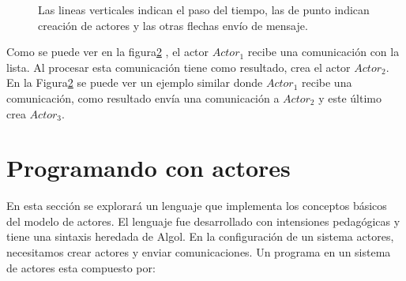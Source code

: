 \begin{figure}[H]
\begin{subfigure}{.5\textwidth}

\label{fig:actores:crecion:b}
\caption{}
\end{subfigure}

\label{fig:actores:crecion}
\caption{Las lineas verticales indican el paso del tiempo, las de punto indican creación de actores y las otras flechas envío de mensaje.}
\end{figure}

Como se puede ver en la figura\ref{fig:actores:crecion} , el actor $Actor_1$ recibe una comunicación con la lista. Al procesar esta comunicación tiene como resultado, crea el actor $Actor_2$. En la Figura\ref{fig:actores:crecion}  se puede ver un ejemplo similar donde $Actor_1$ recibe una comunicación, como resultado envía una comunicación a $Actor_2$ y este último crea $Actor_3$.


\section{Programando con actores}\label{actores:sal}

En esta sección se explorará un lenguaje que implementa los conceptos básicos del modelo de actores. El lenguaje \SAL fue desarrollado con intensiones pedagógicas y tiene una sintaxis heredada de Algol. 
En la configuración de un sistema actores, necesitamos crear actores y enviar comunicaciones. Un programa en un sistema de actores esta compuesto por:

